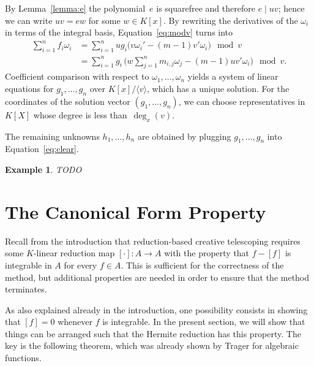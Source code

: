 \documentclass{sig-alternate}
\newtheorem{example}[theorem]{Example}
\def\<#1>{\langle#1\rangle}
\begin{document}
By Lemma~\ref{lemma:e} the polynomial~$e$ is squarefree and therefore $e\mid uv$;
hence we can write $uv=ew$ for some $w\in K[x]$. By rewriting the
derivatives of the $\omega_i$ in terms of the integral basis,
Equation~\eqref{eq:modv} turns into
\begin{align*}
  \sum_{i=1}^n f_i\omega_i
  &= \sum_{i=1}^n ug_i \bigl( v\omega_i' - (m-1)v'\omega_i \bigr) \mod v\\
  &= \sum_{i=1}^n g_i\, \biggl( w\sum_{j=1}^n m_{i,j}\omega_j - (m-1)uv'\omega_i \biggr) \mod v.
\end{align*}
Coefficient comparison with respect to $\omega_1,\ldots,\omega_n$ yields a
system of linear equations for $g_1,\ldots,g_n$ over $K[x]/\<v>$, which has
a unique solution. For the coordinates of the solution vector $(g_1,\dots,g_n)$,
we can choose representatives in $K[X]$ whose degree is less than~$\deg_x(v)$.

The remaining unknowns $h_1,\ldots,h_n$ are obtained by plugging
$g_1,\ldots,g_n$ into Equation~\eqref{eq:clear}.


\begin{example}
TODO
\end{example}

\section{The Canonical Form Property}

Recall from the introduction that reduction-based creative telescoping requires
some $K$-linear reduction map $[\cdot]\colon A\to A$ with the property that
$f-[f]$ is integrable in $A$ for every $f\in A$. This is sufficient for the
correctness of the method, but additional properties are needed in order to
ensure that the method terminates.

As also explained already in the introduction, one possibility consists in
showing that $[f]=0$ whenever $f$ is integrable. In the present section,
we will show that things can be arranged such that the Hermite reduction
has this property. The key is the following theorem, which was already shown
by Trager for algebraic functions.
\end{document}
